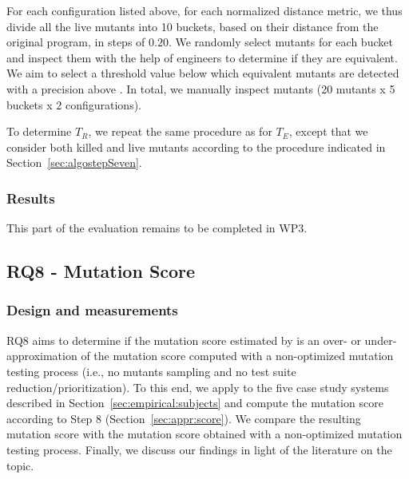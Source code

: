 For each configuration listed above, for each normalized distance metric, we thus divide all the live mutants into 10 buckets, based on their distance from the original program, in steps of $0.20$.
We randomly select  mutants for each bucket and inspect them with the help of engineers to determine if they are equivalent. 
We aim to select a threshold value below which equivalent mutants are detected with a precision above . 
In total, we manually inspect  mutants (20 mutants x 5 buckets x 2 configurations).

To determine $T_R$, we repeat the same procedure as for $T_E$, except that we consider both killed and live mutants according to the procedure indicated in Section~\ref{sec:algostepSeven}.

\subsubsection*{Results}

This part of the evaluation remains to be completed in WP3.
%
%


\subsection{RQ8 - \APPR Mutation Score}

\subsubsection*{Design and measurements}


RQ8 aims to determine if the mutation score estimated by \APPR is an over- or under- approximation of the mutation score computed with a  non-optimized mutation testing process (i.e., no mutants sampling and no test suite reduction/prioritization). 
To this end, we apply \APPR to the five case study systems described in Section~\ref{sec:empirical:subjects} and compute the mutation score according to \APPR Step 8 (Section~\ref{sec:appr:score}).
 We compare the resulting mutation score with the mutation score obtained with a non-optimized mutation testing process.
Finally, we discuss our findings in light of the literature on the topic.


